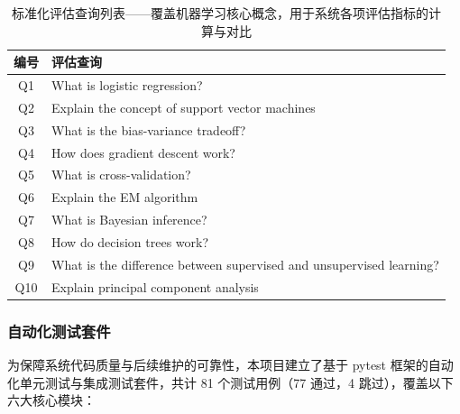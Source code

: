 \documentclass[10pt,a4paper]{article}
\begin{document}
\begin{table}[htbp]
\centering
\begin{tabular}{@{}cl@{}}
\toprule
\textbf{编号} & \textbf{评估查询} \\
\midrule
Q1  & What is logistic regression? \\
Q2  & Explain the concept of support vector machines \\
Q3  & What is the bias-variance tradeoff? \\
Q4  & How does gradient descent work? \\
Q5  & What is cross-validation? \\
Q6  & Explain the EM algorithm \\
Q7  & What is Bayesian inference? \\
Q8  & How do decision trees work? \\
Q9  & What is the difference between supervised and unsupervised learning? \\
Q10 & Explain principal component analysis \\
\bottomrule
\end{tabular}
\caption{标准化评估查询列表——覆盖机器学习核心概念，用于系统各项评估指标的计算与对比}
\label{tab:eval_queries}
\end{table}

\subsubsection{自动化测试套件}

为保障系统代码质量与后续维护的可靠性，本项目建立了基于 pytest 框架的自动化单元测试与集成测试套件，共计 81 个测试用例（77 通过，4 跳过），覆盖以下六大核心模块：
\end{document}
